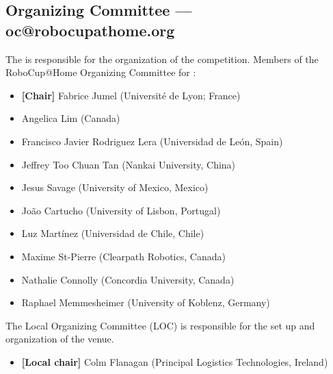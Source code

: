\subsection{Organizing Committee --- oc@robocupathome.org}
\label{sec:oc}
The  is responsible for the organization of the competition. Members of the RoboCup@Home Organizing Committee for \YEAR:

\begin{itemize}
	\item \textbf{[Chair]} Fabrice Jumel (Université de Lyon; France)
	\item Angelica Lim (Canada)
	\item Francisco Javier Rodriguez Lera (Universidad de León, Spain)
	\item Jeffrey Too Chuan Tan (Nankai University, China)
	\item Jesus Savage (University of Mexico, Mexico)
	\item João Cartucho (University of Lisbon, Portugal)
	\item Luz Martínez (Universidad de Chile, Chile)
	\item Maxime St-Pierre (Clearpath Robotics, Canada)
	\item Nathalie Connolly (Concordia University, Canada)
	\item Raphael Memmesheimer (University of Koblenz, Germany)
\end{itemize}

The Local Organizing Committee (LOC) is responsible for the set up and organization of the venue.
\begin{itemize}
	\item \textbf{[Local chair]} Colm Flanagan (Principal Logistics Technologies, Ireland)
\end{itemize}
